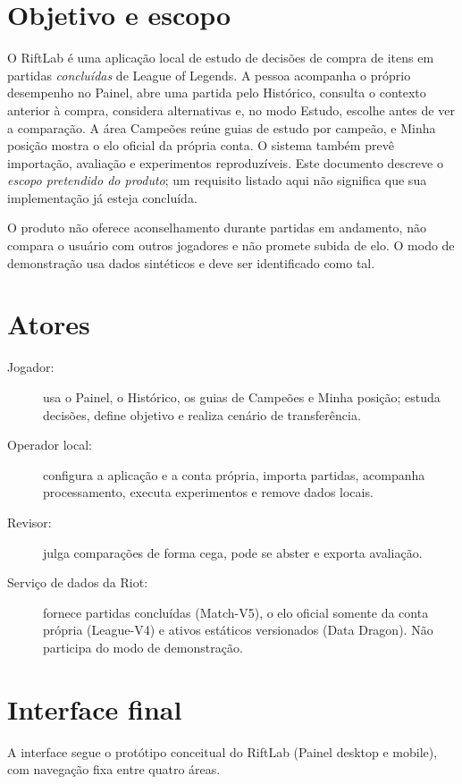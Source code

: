 \documentclass[12pt,a4paper]{article}
\begin{document}
\section{Objetivo e escopo}
O RiftLab é uma aplicação local de estudo de decisões de compra de itens em partidas
\emph{concluídas} de League of Legends. A pessoa acompanha o próprio desempenho no Painel,
abre uma partida pelo Histórico, consulta o contexto anterior à compra, considera
alternativas e, no modo Estudo, escolhe antes de ver a comparação. A área Campeões reúne
guias de estudo por campeão, e Minha posição mostra o elo oficial da própria conta. O
sistema também prevê importação, avaliação e experimentos reproduzíveis. Este documento
descreve o \emph{escopo pretendido do produto}; um requisito listado aqui não significa que
sua implementação já esteja concluída.

O produto não oferece aconselhamento durante partidas em andamento, não compara o usuário
com outros jogadores e não promete subida de elo. O modo de demonstração usa dados
sintéticos e deve ser identificado como tal.

\section{Atores}
\begin{description}
  \item[Jogador:] usa o Painel, o Histórico, os guias de Campeões e Minha posição; estuda
  decisões, define objetivo e realiza cenário de transferência.
  \item[Operador local:] configura a aplicação e a conta própria, importa partidas,
  acompanha processamento, executa experimentos e remove dados locais.
  \item[Revisor:] julga comparações de forma cega, pode se abster e exporta avaliação.
  \item[Serviço de dados da Riot:] fornece partidas concluídas (Match-V5), o elo oficial
  somente da conta própria (League-V4) e ativos estáticos versionados (Data Dragon). Não
  participa do modo de demonstração.
\end{description}

\section{Interface final}
A interface segue o protótipo conceitual do RiftLab (Painel desktop e mobile), com
navegação fixa entre quatro áreas.
\end{document}
